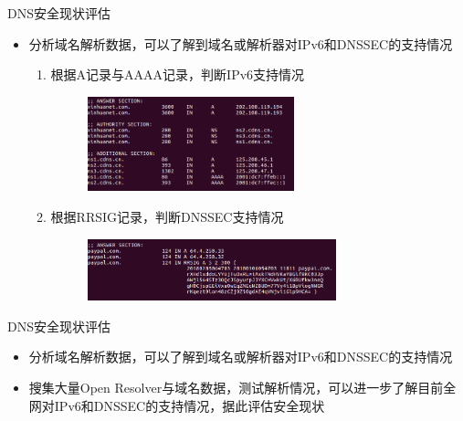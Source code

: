 \documentclass{beamer}
\begin{document}
\begin{frame}{DNS安全现状评估}
  \begin{itemize}
    \item 分析域名解析数据，可以了解到域名或解析器对IPv6和DNSSEC的支持情况
    \begin{enumerate}
      \item 根据A记录与AAAA记录，判断IPv6支持情况
      \begin{figure}
        \includegraphics[height=2.74cm,width=6cm]{images/aaaa.png}
      \end{figure} 
  
      \item 根据RRSIG记录，判断DNSSEC支持情况
      \begin{figure}
        \includegraphics[height=1.79cm,width=7.21cm]{images/dnssec.png}
      \end{figure} 
    \end{enumerate}
  \end{itemize}
  

\end{frame}

\begin{frame}{DNS安全现状评估}
  \begin{itemize}
    \item 分析域名解析数据，可以了解到域名或解析器对IPv6和DNSSEC的支持情况
    \item 搜集大量Open Resolver与域名数据，测试解析情况，可以进一步了解目前全网对IPv6和DNSSEC的支持情况，据此评估安全现状
  \end{itemize}
  

\end{frame}
\end{document}
